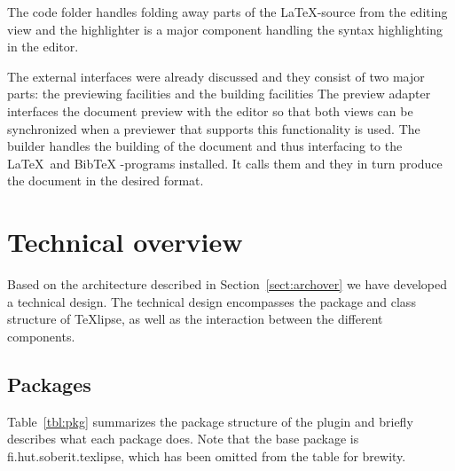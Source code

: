 \documentclass[a4paper,11pt,twoside]{article}
\newcommand{\texlipse}{\TeX lipse}
\begin{document}
The code folder handles folding away parts of the \LaTeX -source from
the editing view and the highlighter is a major component handling the
syntax highlighting in the editor.

The external interfaces were already discussed and they consist of two
major parts: the previewing facilities and the building facilities
The preview adapter interfaces the document preview with the
editor so that both views can be synchronized when a previewer that
supports this functionality is used. The builder handles the building
of the document and thus interfacing to the \LaTeX\ and Bib\TeX
-programs installed. It calls them and they in turn produce the
document in the desired format.



\section{Technical overview}
\label{sect:technover}

Based on the architecture described in Section~\ref{sect:archover} we
have developed a technical design. The technical design encompasses
the package and class structure of \texlipse, as well as the
interaction between the different components.


\subsection{Packages}

Table~\ref{tbl:pkg} summarizes the package structure of the plugin and
briefly describes what each package does. Note that the base package
is fi.hut.soberit.texlipse, which has been omitted from the table for
brewity.
\end{document}
